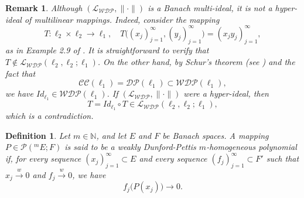 \documentclass[12 pt]{article}%
\newtheorem{remark}[theorem]{Remark}
\newtheorem{final remark}[theorem]{Final Remark}
\newtheorem{definition}[theorem]{Definition}
\begin{document}
\begin{remark}
	Although $(\mathcal{L_{WDP}}, \|\cdot\|)$ is a Banach multi-ideal, it is not a hyper-ideal of multilinear mappings. Indeed, consider the mapping
	\[
	T\colon \ell_2 \times \ell_2 \to \ell_1, \quad
	T\big((x_j)_{j=1}^{\infty}, (y_j)_{j=1}^{\infty}\big) = (x_j y_j)_{j=1}^{\infty},
	\]
	as in Example 2.9 of \cite{RST22}. It is straightforward to verify that $T \notin \mathcal{L_{WDP}}(\ell_2,\ell_2;\ell_1)$. On the other hand, by Schur's theorem (see \cite[Theorem 1.7]{DJT95}) and the fact that
	\[
	\mathcal{CC}(\ell_1) = \mathcal{DP}(\ell_1) \subset \mathcal{WDP}(\ell_1),
	\]
	we have $Id_{\ell_1} \in \mathcal{WDP}(\ell_1)$. If $(\mathcal{L_{WDP}}, \|\cdot\|)$ were a hyper-ideal, then
	\[
	T = Id_{\ell_1} \circ T \in \mathcal{L_{WDP}}(\ell_2,\ell_2;\ell_1),
	\]
	which is a contradiction.
\end{remark}

\begin{definition}
	Let $m \in \mathbb{N}$, and let $E$ and $F$ be Banach spaces. A mapping $P \in \mathcal{P}(^mE;F)$ is said to be a weakly Dunford-Pettis $m$-homogeneous polynomial if, for every sequence $(x_j)_{j=1}^{\infty} \subset E$ and every sequence $(f_j)_{j=1}^{\infty} \subset F'$ such that $x_j \overset{w}{\to} 0$ and $f_j \overset{w}{\to} 0$, we have
	\begin{equation*}
		f_j\big(P(x_j)\big) \longrightarrow 0.
	\end{equation*}
\end{definition}
\end{document}
